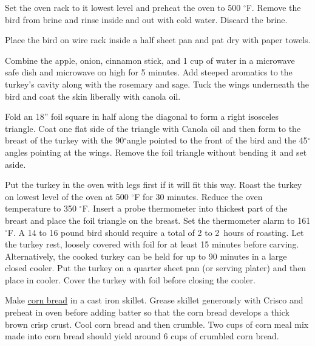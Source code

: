 \documentclass[letterpaper]{recipePMG}
\renewcommand{\deg}{$^\circ$}
\newcommand{\half}{\nicefrac{1}{2} \,}
\begin{document}
Set the oven rack to it lowest level and preheat the oven to 500 \deg F. Remove the bird from brine and rinse inside and out with cold water. Discard the brine. 

Place the bird on wire rack inside a half sheet pan and pat dry with paper towels.


Combine the apple, onion, cinnamon stick, and 1 cup of water in a microwave safe dish and microwave on high for 5 minutes. Add steeped aromatics to the turkey's cavity along with the rosemary and sage. Tuck the wings underneath the bird and coat the skin liberally with canola oil.  

Fold an 18'' foil square in half along the diagonal to form a right isosceles triangle. Coat one flat side of the triangle with Canola oil and then form to the breast of the turkey with the 90\deg angle pointed to the front of the bird and the 45\deg angles pointing at the wings.  Remove the foil triangle without bending it and set aside.


Put the turkey in the oven with legs first if it will fit this way. Roast the turkey on lowest level of the oven at 500 \deg F for 30 minutes. Reduce the oven temperature to 350 \deg F. Insert a probe thermometer into thickest part of the breast and place the foil triangle on the breast.  Set the thermometer alarm to 161 \deg F. A 14 to 16 pound bird should require a total of 2 to 2\half hours of roasting. Let the turkey rest, loosely covered with foil for at least 15 minutes before carving. Alternatively, the cooked turkey can be held for up to 90 minutes in a large closed cooler.  Put the turkey on a quarter sheet pan (or serving plater) and then place in  cooler. Cover the turkey with foil before closing the cooler.

\newpage
{}
\label{OysterDressing}

Make \hyperref[cornbread]{corn bread} in a cast iron skillet.
Grease skillet generously with Crisco and preheat in oven before adding 
batter so that the corn bread develops a thick brown crisp crust. 
Cool corn bread and then crumble. Two cups of corn meal mix made into
corn bread should yield around 6 cups of crumbled corn bread.
\end{document}

